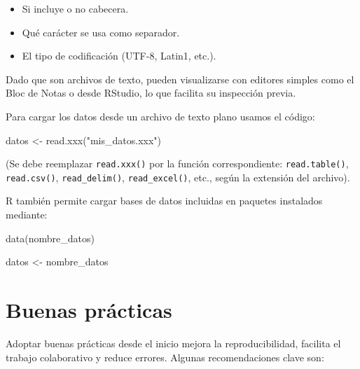 \documentclass[
  spanish,
  a4paper,
]{scrbook}
\newenvironment{Shaded}{\begin{snugshade}}{\end{snugshade}}
\newcommand{\FunctionTok}[1]{\textcolor[rgb]{0.28,0.35,0.67}{#1}}
\newcommand{\NormalTok}[1]{\textcolor[rgb]{0.00,0.23,0.31}{#1}}
\newcommand{\OtherTok}[1]{\textcolor[rgb]{0.00,0.23,0.31}{#1}}
\newcommand{\StringTok}[1]{\textcolor[rgb]{0.13,0.47,0.30}{#1}}
\begin{document}
\begin{itemize}
\item
  Si incluye o no cabecera.
\item
  Qué carácter se usa como separador.
\item
  El tipo de codificación (UTF-8, Latin1, etc.).
\end{itemize}

Dado que son archivos de texto, pueden visualizarse con editores simples
como el Bloc de Notas o desde RStudio, lo que facilita su inspección
previa.

Para cargar los datos desde un archivo de texto plano usamos el código:

\begin{Shaded}
\begin{Highlighting}[]
\NormalTok{datos }\OtherTok{\textless{}{-}} \FunctionTok{read.xxx}\NormalTok{(}\StringTok{"mis\_datos.xxx"}\NormalTok{)}
\end{Highlighting}
\end{Shaded}

(Se debe reemplazar \texttt{read.xxx()} por la función correspondiente:
\texttt{read.table()}, \texttt{read.csv()}, \texttt{read\_delim()},
\texttt{read\_excel()}, etc., según la extensión del archivo).

R también permite cargar bases de datos incluidas en paquetes instalados
mediante:

\begin{Shaded}
\begin{Highlighting}[]
\FunctionTok{data}\NormalTok{(nombre\_datos)}

\NormalTok{datos }\OtherTok{\textless{}{-}}\NormalTok{ nombre\_datos}
\end{Highlighting}
\end{Shaded}

\section{Buenas prácticas}\label{buenas-pruxe1cticas}

Adoptar buenas prácticas desde el inicio mejora la reproducibilidad,
facilita el trabajo colaborativo y reduce errores. Algunas
recomendaciones clave son:
\end{document}
